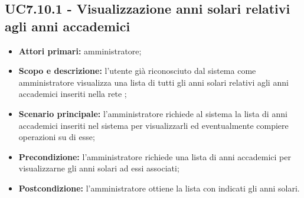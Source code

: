 \documentclass[AnalisiDeiRequisiti.tex]{subfiles}
\begin{document}
\subsection{UC7.10.1 - Visualizzazione anni solari relativi agli anni accademici}
\begin{itemize}
\item \textbf{Attori primari:} amministratore;
\item \textbf{Scopo e descrizione:} l'utente già riconosciuto dal sistema come amministratore visualizza una lista di tutti gli anni solari relativi agli anni accademici inseriti nella rete ;
\item \textbf{Scenario principale:} l'amministratore richiede al sistema la lista di anni accademici inseriti nel sistema per visualizzarli ed eventualmente compiere operazioni su di esse;
\item \textbf{Precondizione:} l'amministratore richiede una lista di anni accademici per visualizzarne gli anni solari ad essi associati; 
\item \textbf{Postcondizione:} l'amministratore ottiene la lista con indicati gli anni solari.
\end{itemize}
\end{document}
